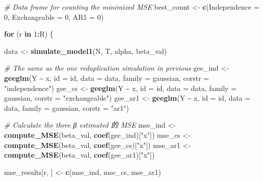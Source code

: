 \documentclass[
]{article}
\newenvironment{Shaded}{\begin{snugshade}}{\end{snugshade}}
\newcommand{\AttributeTok}[1]{\textcolor[rgb]{0.13,0.29,0.53}{#1}}
\newcommand{\CommentTok}[1]{\textcolor[rgb]{0.56,0.35,0.01}{\textit{#1}}}
\newcommand{\ControlFlowTok}[1]{\textcolor[rgb]{0.13,0.29,0.53}{\textbf{#1}}}
\newcommand{\DecValTok}[1]{\textcolor[rgb]{0.00,0.00,0.81}{#1}}
\newcommand{\FunctionTok}[1]{\textcolor[rgb]{0.13,0.29,0.53}{\textbf{#1}}}
\newcommand{\NormalTok}[1]{#1}
\newcommand{\OtherTok}[1]{\textcolor[rgb]{0.56,0.35,0.01}{#1}}
\newcommand{\SpecialCharTok}[1]{\textcolor[rgb]{0.81,0.36,0.00}{\textbf{#1}}}
\newcommand{\StringTok}[1]{\textcolor[rgb]{0.31,0.60,0.02}{#1}}
\begin{document}
\begin{Shaded}
\begin{Highlighting}[]
  \CommentTok{\# Data frame for counting the minimized MSE}
\NormalTok{  best\_count }\OtherTok{\textless{}{-}} \FunctionTok{c}\NormalTok{(}\AttributeTok{Independence =} \DecValTok{0}\NormalTok{, }\AttributeTok{Exchangeable =} \DecValTok{0}\NormalTok{, }\AttributeTok{AR1 =} \DecValTok{0}\NormalTok{)}
  
  \ControlFlowTok{for}\NormalTok{ (r }\ControlFlowTok{in} \DecValTok{1}\SpecialCharTok{:}\NormalTok{R) \{}

\NormalTok{    data }\OtherTok{\textless{}{-}} \FunctionTok{simulate\_model1}\NormalTok{(N, T, alpha, beta\_val)}
    
    \CommentTok{\# The same as the one reduplication simulation in previous}
\NormalTok{    gee\_ind }\OtherTok{\textless{}{-}} \FunctionTok{geeglm}\NormalTok{(Y }\SpecialCharTok{\textasciitilde{}}\NormalTok{ x, }\AttributeTok{id =}\NormalTok{ id, }\AttributeTok{data =}\NormalTok{ data, }\AttributeTok{family =}\NormalTok{ gaussian, }\AttributeTok{corstr =} \StringTok{"independence"}\NormalTok{)}
\NormalTok{    gee\_cs  }\OtherTok{\textless{}{-}} \FunctionTok{geeglm}\NormalTok{(Y }\SpecialCharTok{\textasciitilde{}}\NormalTok{ x, }\AttributeTok{id =}\NormalTok{ id, }\AttributeTok{data =}\NormalTok{ data, }\AttributeTok{family =}\NormalTok{ gaussian, }\AttributeTok{corstr =} \StringTok{"exchangeable"}\NormalTok{)}
\NormalTok{    gee\_ar1 }\OtherTok{\textless{}{-}} \FunctionTok{geeglm}\NormalTok{(Y }\SpecialCharTok{\textasciitilde{}}\NormalTok{ x, }\AttributeTok{id =}\NormalTok{ id, }\AttributeTok{data =}\NormalTok{ data, }\AttributeTok{family =}\NormalTok{ gaussian, }\AttributeTok{corstr =} \StringTok{"ar1"}\NormalTok{)}
    
    \CommentTok{\# Calculate the three β estimated 的 MSE}
\NormalTok{    mse\_ind }\OtherTok{\textless{}{-}} \FunctionTok{compute\_MSE}\NormalTok{(beta\_val, }\FunctionTok{coef}\NormalTok{(gee\_ind)[}\StringTok{"x"}\NormalTok{])}
\NormalTok{    mse\_cs  }\OtherTok{\textless{}{-}} \FunctionTok{compute\_MSE}\NormalTok{(beta\_val, }\FunctionTok{coef}\NormalTok{(gee\_cs)[}\StringTok{"x"}\NormalTok{])}
\NormalTok{    mse\_ar1 }\OtherTok{\textless{}{-}} \FunctionTok{compute\_MSE}\NormalTok{(beta\_val, }\FunctionTok{coef}\NormalTok{(gee\_ar1)[}\StringTok{"x"}\NormalTok{])}
    
\NormalTok{    mse\_results[r, ] }\OtherTok{\textless{}{-}} \FunctionTok{c}\NormalTok{(mse\_ind, mse\_cs, mse\_ar1)}
    

\end{Highlighting}
\end{Shaded}
\end{document}

